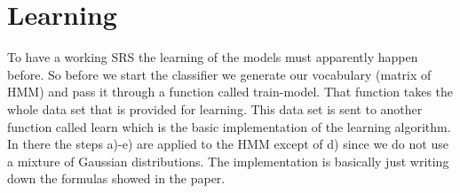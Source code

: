 \documentclass[titlepage]{article}
\begin{document}
\section{Learning}\label{sec:learn}
To have a working SRS the learning of the models must apparently happen before. So before we start the classifier we generate our vocabulary (matrix of HMM) and pass it through a function called train-model. That function takes the whole data set that is provided for learning. This data set is sent to another function called learn which is the basic implementation of the learning algorithm. In there the steps a)-e) are applied to the HMM except of d) since we do not use a mixture of Gaussian distributions. The implementation is basically just writing down the formulas showed in the paper.
\end{document}
